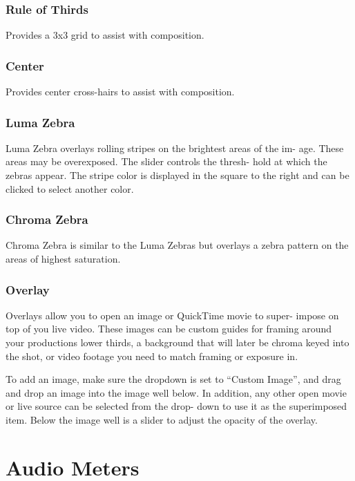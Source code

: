 \documentclass[10,letterpaper,]{report}
\begin{document}
\subsection{Rule of Thirds}

Provides a 3x3 grid to assist with composition.

\subsection{Center}

Provides center cross-hairs to assist with composition.

\subsection{Luma Zebra}

Luma Zebra overlays rolling stripes on the brightest areas of the im-
age. These areas may be overexposed. The slider controls the thresh-
hold at which the zebras appear. The stripe color is displayed in the
square to the right and can be clicked to select another color.

\subsection{Chroma Zebra}

Chroma Zebra is similar to the Luma Zebras but overlays a zebra pattern
on the areas of highest saturation.

\subsection{Overlay}

Overlays allow you to open an image or QuickTime movie to super- impose
on top of you live video. These images can be custom guides for framing
around your productions lower thirds, a background that will later be
chroma keyed into the shot, or video footage you need to match framing
or exposure in.

To add an image, make sure the dropdown is set to ``Custom Image'', and
drag and drop an image into the image well below. In addition, any other
open movie or live source can be selected from the drop- down to use it
as the superimposed item. Below the image well is a slider to adjust the
opacity of the overlay.

\chapter{Audio Meters}
\end{document}
